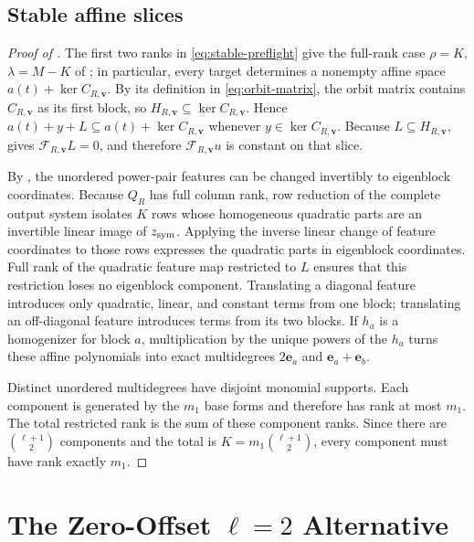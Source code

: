\documentclass[11pt]{article}
\begin{document}
\subsection{Stable affine slices}\label{app:proof-stable-slices}

\begin{proof}[Proof of ]
The first two ranks in \eqref{eq:stable-preflight} give the full-rank case
$\rho=K$, $\lambda=M-K$ of ; in particular, every target determines a
nonempty affine space $a(t)+\ker C_{R,\mathbf v}$.  By its definition in
\eqref{eq:orbit-matrix}, the orbit matrix contains $C_{R,\mathbf v}$ as its
first block, so
$H_{R,\mathbf v}\subseteq\ker C_{R,\mathbf v}$.  Hence
$a(t)+y+L\subseteq a(t)+\ker C_{R,\mathbf v}$ whenever
$y\in\ker C_{R,\mathbf v}$.  Because
$L\subseteq H_{R,\mathbf v}$,  gives
$\mathcal F_{R,\mathbf v}L=0$, and therefore $\mathcal F_{R,\mathbf v}u$ is constant on that
slice.

By , the unordered power-pair features can be
changed invertibly to eigenblock coordinates.  Because $Q_R$ has full column
rank, row reduction of the complete output system isolates $K$ rows whose
homogeneous quadratic parts are an invertible linear image of
$z_{\rm sym}$.  Applying the inverse linear change of feature coordinates to
those rows expresses the
quadratic parts in eigenblock coordinates.  Full rank of the quadratic feature
map restricted to $L$ ensures that this restriction loses no eigenblock
component.  Translating a diagonal feature introduces only
quadratic, linear, and constant terms from one block; translating an
off-diagonal feature introduces terms from its two blocks.  If $h_a$ is a
homogenizer for block $a$, multiplication by the unique powers of the $h_a$
turns these affine polynomials into exact multidegrees $2\mathbf e_a$ and
$\mathbf e_a+\mathbf e_b$.

Distinct unordered multidegrees have disjoint monomial supports.  Each
component is generated by the $m_1$ base forms and therefore has rank at most
$m_1$.  The total restricted rank is the sum of these component ranks.  Since
there are $\binom{\ell+1}{2}$ components and the total is
$K=m_1\binom{\ell+1}{2}$, every component must have rank exactly $m_1$.
\end{proof}

\section{The Zero-Offset \texorpdfstring{$\ell=2$}{l=2} Alternative}
\label{app:zero-offset}
\end{document}
